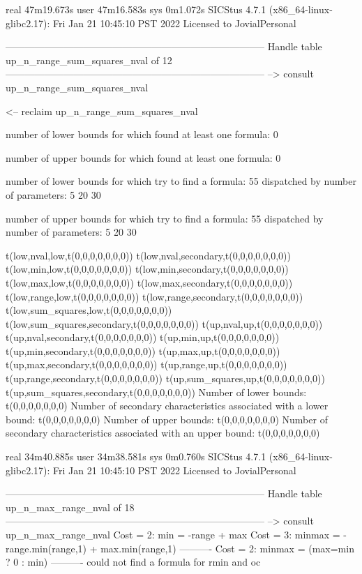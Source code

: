 real	47m19.673s
user	47m16.583s
sys	0m1.072s
SICStus 4.7.1 (x86_64-linux-glibc2.17): Fri Jan 21 10:45:10 PST 2022
Licensed to JovialPersonal


--------------------------------------------------------------------------------
Handle table up_n_range_sum_squares_nval of 12
--------------------------------------------------------------------------------
--> consult up_n_range_sum_squares_nval

<-- reclaim up_n_range_sum_squares_nval

number of lower bounds for which found at least one formula: 0

number of upper bounds for which found at least one formula: 0

number of lower bounds for which try to find a formula: 55
dispatched by number of parameters: 5  20  30

number of upper bounds for which try to find a formula: 55
dispatched by number of parameters: 5  20  30

t(low,nval,low,t(0,0,0,0,0,0,0))
t(low,nval,secondary,t(0,0,0,0,0,0,0))
t(low,min,low,t(0,0,0,0,0,0,0))
t(low,min,secondary,t(0,0,0,0,0,0,0))
t(low,max,low,t(0,0,0,0,0,0,0))
t(low,max,secondary,t(0,0,0,0,0,0,0))
t(low,range,low,t(0,0,0,0,0,0,0))
t(low,range,secondary,t(0,0,0,0,0,0,0))
t(low,sum_squares,low,t(0,0,0,0,0,0,0))
t(low,sum_squares,secondary,t(0,0,0,0,0,0,0))
t(up,nval,up,t(0,0,0,0,0,0,0))
t(up,nval,secondary,t(0,0,0,0,0,0,0))
t(up,min,up,t(0,0,0,0,0,0,0))
t(up,min,secondary,t(0,0,0,0,0,0,0))
t(up,max,up,t(0,0,0,0,0,0,0))
t(up,max,secondary,t(0,0,0,0,0,0,0))
t(up,range,up,t(0,0,0,0,0,0,0))
t(up,range,secondary,t(0,0,0,0,0,0,0))
t(up,sum_squares,up,t(0,0,0,0,0,0,0))
t(up,sum_squares,secondary,t(0,0,0,0,0,0,0))
Number of lower bounds:                                             t(0,0,0,0,0,0,0)
Number of secondary characteristics associated with a lower bound:  t(0,0,0,0,0,0,0)
Number of upper bounds:                                             t(0,0,0,0,0,0,0)
Number of secondary characteristics associated with an upper bound: t(0,0,0,0,0,0,0)

real	34m40.885s
user	34m38.581s
sys	0m0.760s
SICStus 4.7.1 (x86_64-linux-glibc2.17): Fri Jan 21 10:45:10 PST 2022
Licensed to JovialPersonal


--------------------------------------------------------------------------------
Handle table up_n_max_range_nval of 18
--------------------------------------------------------------------------------
--> consult up_n_max_range_nval
Cost =  2:  min    = -range + max
Cost =  3:  minmax = -range.min(range,1) + max.min(range,1)
----------
Cost =  2:  minmax = (max=min ? 0 : min)
----------
could not find a formula for rmin and oc

